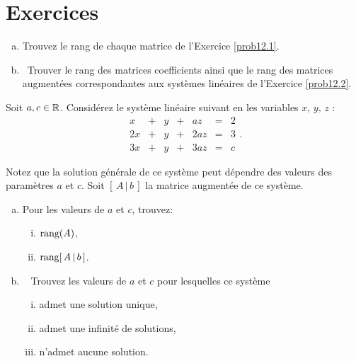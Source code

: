 \newpage
\section*{Exercices}




\begin{prob} \label{prob13.1} 

 

\begin{enumerate}[a)]

\item Trouvez le rang de chaque matrice de l'Exercice \ref{prob12.1}.
\medskip
 
\item\sov~Trouver le rang des matrices coefficients ainsi que le rang des matrices augmentées correspondantes aux systèmes linéaires de l'Exercice \ref{prob12.2}.

\medskip 
 

\end{enumerate}
\end{prob} \begin{prob} \label{prob13.2} Soit $a,c\in \mathbb{R}$. Considérez le système linéaire suivant en les variables
$x,\, y,\,z$ : 
$$\begin{matrix}  x&+&y &+&az&=&2\\
2x&+&y&+&2a z  &=&3\\ 
3x&+&y &+&3az&=&c \end{matrix}. $$

Notez que la solution générale de ce système peut dépendre des
valeurs des paramètres $a$ et $c$.
Soit $[\,A\,|\, b\,]$ la matrice augmentée de ce système.

\begin{enumerate}[a)]
\item  Pour 
 les valeurs de
$a$ et $c$, trouvez:\smallskip
\begin{enumerate}[(i)]
\item 
$\textrm{rang} (A)$,
\smallskip
\item  $\textrm{rang}[\,A\,|\, b\,]$.
\end{enumerate}

\item\sov~ Trouvez  les valeurs de
$a$ et $c$ pour lesquelles ce syst\`eme \smallskip
\begin{enumerate}[(i)]
 
\item admet une solution unique,\smallskip
\item  admet une infinit\'e de solutions,  \smallskip
\item  n'admet aucune solution. 
\end{enumerate}


\end{enumerate}
\end{prob}
